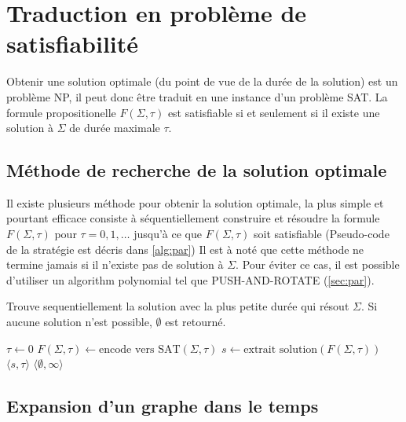 \documentclass[french, 10pt, letterpaper]{article}
\theoremstyle{definition}
\theoremstyle{proposition}
\theoremstyle{example}
\begin{document}
    \newpage
    \section{Traduction en problème de satisfiabilité}

    Obtenir une solution optimale (du point de vue de la durée de la solution) est un problème NP, il peut donc être traduit en une instance
    d'un problème SAT. La formule propositionelle $F(\Sigma, \tau)$ est satisfiable si et seulement si il existe une solution à $\Sigma$
    de durée maximale $\tau$.

    \subsection{Méthode de recherche de la solution optimale}
    \label{sec:methiter}

    Il existe plusieurs méthode pour obtenir la solution optimale, la plus simple et pourtant efficace consiste à séquentiellement construire
    et résoudre la formule $F(\Sigma, \tau)$ pour $\tau = 0, 1, \ldots$ jusqu'à ce que $F(\Sigma, \tau)$ soit satisfiable 
    (Pseudo-code de la stratégie est décris dans \ref{alg:par})
    Il est à noté que cette méthode ne termine jamais si il n'existe pas de solution à $\Sigma$. Pour éviter ce cas, il est possible 
    d'utiliser un algorithm polynomial tel que PUSH-AND-ROTATE \cite{WILDEPAR} (\ref{sec:par}).

    \begin{algorithm}
        \caption{Trouve sequentiellement la solution avec la plus petite durée qui résout $\Sigma$. 
        Si aucune solution n'est possible, $\emptyset$ est retourné.}
        \begin{algorithmic}
            \label{alg:par}
                \STATE $\tau \leftarrow 0$
                \LOOP
                    \STATE $F(\Sigma, \tau) \leftarrow \text{encode vers SAT}(\Sigma, \tau)$
                        \STATE $s \leftarrow \text{extrait solution}(F(\Sigma, \tau))$
                        \RETURN $\langle s, \tau \rangle$ 
                    \ENDIF
                \ENDLOOP
            \ELSE
                \RETURN $\langle \emptyset, \infty \rangle$ 
            \ENDIF
        \end{algorithmic}
    \end{algorithm}
        
    \subsection{Expansion d'un graphe dans le temps}
\end{document}
